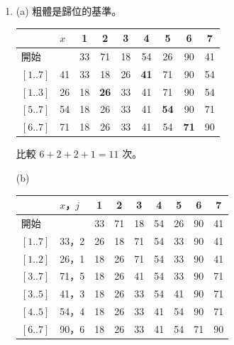 \begin{enumerate}
(b) 對 $k$ 歸納。 $k = 0$：$W(1) = 0 = 0 - 1 + 1$。 $k \ge 1$：
$W(2^k) = 2W(2^{k-1}) + 2^k - 1 = 2\bigl((k-1)2^{k-1} - 2^{k-1} + 1\bigr) + 2^k - 1
= k\,2^k - 2^k + 1$。

(c) 例如 $\langle 1, 5, 3, 7, 2, 6, 4, 8 \rangle$。 一次合併要比滿 $m_1 + m_2 - 1$ 次，條件是
兩邊的數一直交錯，直到其中一邊只剩最後一個。 這個排列把排好的 $1..8$ 依名次的奇偶分成左右
兩半，每一半再照同樣的方法分，所以每一次合併兩邊都完全交錯：四次 $1 + 1$ 的合併各比 $1$
次，兩次 $2 + 2$ 各比 $3$ 次，最後 $4 + 4$ 比 $7$ 次，共 $4 + 6 + 7 = 17$。 第
\ref{sec:so-compare}~節例題的 $\langle 36, 71, 19, 54, 8, 92, 43, 27 \rangle$ 也剛好比 $17$ 次。

\item (a) 粗體是歸位的基準。
\begin{center}
\begin{tabular}{ll*{7}{c}}
\toprule
& $x$ & 1 & 2 & 3 & 4 & 5 & 6 & 7 \\
\midrule
開始 & & 33 & 71 & 18 & 54 & 26 & 90 & 41 \\
$[1..7]$ & 41 & 33 & 18 & 26 & \textbf{41} & 71 & 90 & 54 \\
$[1..3]$ & 26 & 18 & \textbf{26} & 33 & 41 & 71 & 90 & 54 \\
$[5..7]$ & 54 & 18 & 26 & 33 & 41 & \textbf{54} & 90 & 71 \\
$[6..7]$ & 71 & 18 & 26 & 33 & 41 & 54 & \textbf{71} & 90 \\
\bottomrule
\end{tabular}
\end{center}
比較 $6 + 2 + 2 + 1 = 11$ 次。

(b)
\begin{center}
\begin{tabular}{ll*{7}{c}}
\toprule
& $x$，$j$ & 1 & 2 & 3 & 4 & 5 & 6 & 7 \\
\midrule
開始 & & 33 & 71 & 18 & 54 & 26 & 90 & 41 \\
$[1..7]$ & 33，2 & 26 & 18 & 71 & 54 & 33 & 90 & 41 \\
$[1..2]$ & 26，1 & 18 & 26 & 71 & 54 & 33 & 90 & 41 \\
$[3..7]$ & 71，5 & 18 & 26 & 41 & 54 & 33 & 90 & 71 \\
$[3..5]$ & 41，3 & 18 & 26 & 33 & 54 & 41 & 90 & 71 \\
$[4..5]$ & 54，4 & 18 & 26 & 33 & 41 & 54 & 90 & 71 \\
$[6..7]$ & 90，6 & 18 & 26 & 33 & 41 & 54 & 71 & 90 \\
\bottomrule
\end{tabular}
\end{center}


\end{enumerate}

